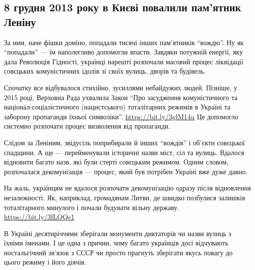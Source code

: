  
 
 
 
 
 
\subsection{8 грудня 2013 року в Києві повалили пам’ятник Леніну}
\label{sec:08_12_2020.fb.promovu.1.lenin}

За ним, наче фішки доміно, попадали тисячі інших пам’ятників \enquote{вождю}. Ну як
\enquote{попадали} — їм наполегливо допомогли впасти.  Завдяки потужній енергії, яку
дала Революція Гідності, українці нарешті розпочали масовий процес ліквідації
совєцьких комуністичних ідолів зі своїх вулиць, дворів та будівель.

Спочатку все відбувалося стихійно, зусиллями небайдужих людей. Пізніше, у 2015
році, Верховна Рада ухвалила Закон \enquote{Про засудження комуністичного та
націонал-соціалістичного (нацистського) тоталітарних режимів в Україні та
заборону пропаганди їхньої символіки}. \url{https://bit.ly/3glM14u} Це допомогло
системно розпочати процес визволення від пропаганди.

Слідом за Леніним, звідусіль поприбирали й інших \enquote{вождів} і об’єкти совєцької
спадщини. А ще — перейменували історичні назви міст, сіл та вулиць. Вдалося
відновити багато назв, які були стерті совєцьким режимом. Одним словом,
розпочалася декомунізація — процес, який був потрібен Україні вже дуже давно.

На жаль, українцям не вдалося розпочати декомунізацію одразу після відновлення
незалежності. Як, наприклад, громадянам Литви, де швидко позбулися залишків
тоталітарного минулого і почали будувати вільну державу. \url{https://bit.ly/3fLOQe1}  

В Україні десятиріччями зберігали монументи диктаторів чи назви вулиць з їхніми
іменами. І це одна з причин, чому багато українців досі відчувають
ностальгічний зв’язок з СССР чи просто прагнуть зберігати якусь повагу до цього
режиму і його діячів. 

